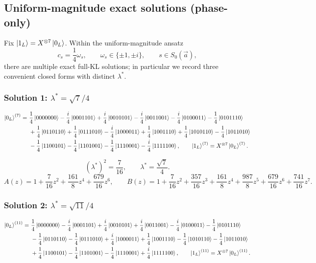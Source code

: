 \documentclass[11pt]{article}
\begin{document}
\subsection{Uniform-magnitude exact solutions (phase-only)}

Fix \(\ket{1_L}=X^{\otimes 7}\ket{0_L}\). Within the uniform-magnitude ansatz
\[
c_s=\frac{1}{4}\omega_s,\qquad \omega_s\in\{\pm 1,\pm i\},\qquad s\in S_0(\vec a),
\]
there are multiple exact full-KL solutions; in particular we record three convenient closed forms with distinct \(\lambda^\ast\).

\subsubsection{Solution 1: \texorpdfstring{$\lambda^\ast=\sqrt7/4$}{lambda*=sqrt7/4}}

\[
\begin{aligned}
\ket{0_L}^{(7)}=
&\ \frac{1}{4}\ket{0000000}
-\frac{i}{4}\ket{0001101}
+\frac{i}{4}\ket{0010101}
-\frac{i}{4}\ket{0011001}
-\frac{i}{4}\ket{0100011}
-\frac{1}{4}\ket{0101110}\\
&\ +\frac{1}{4}\ket{0110110}
+\frac{1}{4}\ket{0111010}
-\frac{i}{4}\ket{1000011}
+\frac{1}{4}\ket{1001110}
+\frac{1}{4}\ket{1010110}
-\frac{1}{4}\ket{1011010}\\
&\ -\frac{1}{4}\ket{1100101}
-\frac{1}{4}\ket{1101001}
-\frac{1}{4}\ket{1110001}
-\frac{i}{4}\ket{1111100},\qquad
\ket{1_L}^{(7)}=X^{\otimes 7}\ket{0_L}^{(7)}.
\end{aligned}
\]

\[
\boxed{(\lambda^\ast)^2=\frac{7}{16},\qquad \lambda^\ast=\frac{\sqrt7}{4}.}
\]
\[
A(z)=1+\frac{7}{16}z^2+\frac{161}{8}z^4+\frac{679}{16}z^6,\qquad
B(z)=1+\frac{7}{16}z^2+\frac{357}{16}z^3+\frac{161}{8}z^4+\frac{987}{8}z^5+\frac{679}{16}z^6+\frac{741}{16}z^7.
\]

\subsubsection{Solution 2: \texorpdfstring{$\lambda^\ast=\sqrt{11}/4$}{lambda*=sqrt11/4}}

\[
\begin{aligned}
\ket{0_L}^{(11)}=
&\ \frac{1}{4}\ket{0000000}
-\frac{i}{4}\ket{0001101}
+\frac{i}{4}\ket{0010101}
+\frac{i}{4}\ket{0011001}
-\frac{i}{4}\ket{0100011}
-\frac{1}{4}\ket{0101110}\\
&\ -\frac{1}{4}\ket{0110110}
-\frac{1}{4}\ket{0111010}
+\frac{i}{4}\ket{1000011}
+\frac{1}{4}\ket{1001110}
-\frac{1}{4}\ket{1010110}
-\frac{1}{4}\ket{1011010}\\
&\ +\frac{1}{4}\ket{1100101}
-\frac{1}{4}\ket{1101001}
-\frac{1}{4}\ket{1110001}
+\frac{i}{4}\ket{1111100},\qquad
\ket{1_L}^{(11)}=X^{\otimes 7}\ket{0_L}^{(11)}.
\end{aligned}
\]
\end{document}
